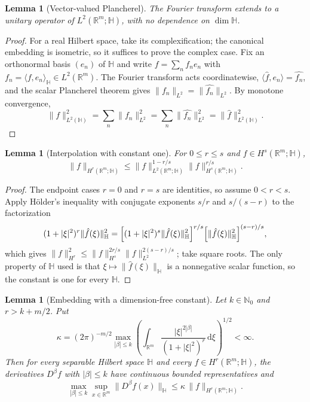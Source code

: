 \documentclass[11pt]{article}
\newtheorem{lemma}[theorem]{Lemma}
\theoremstyle{definition}
\theoremstyle{remark}
\newcommand{\R}{\mathbb{R}}
\newcommand{\dd}{\mathrm{d}}
\begin{document}
\begin{lemma}[Vector-valued Plancherel]\label{lem:vector-plancherel}
The Fourier transform extends to a unitary operator of $L^2(\R^m;\mathbb H)$, with no
dependence on $\dim\mathbb H$.
\end{lemma}

\begin{proof}
For a real Hilbert space, take its complexification; the canonical embedding is
isometric, so it suffices to prove the complex case.
Fix an orthonormal basis $(e_n)$ of $\mathbb H$ and write $f=\sum_nf_ne_n$ with
$f_n=\langle f,e_n\rangle_{\mathbb H}\in L^2(\R^m)$. The Fourier transform acts
coordinatewise, $\langle\hat f,e_n\rangle=\widehat{f_n}$, and the scalar
Plancherel theorem gives $\|f_n\|_{L^2}=\|\widehat{f_n}\|_{L^2}$. By monotone
convergence,
\[
\|f\|_{L^2(\mathbb H)}^2=\sum_n\|f_n\|_{L^2}^2
=\sum_n\|\widehat{f_n}\|_{L^2}^2=\|\hat f\|_{L^2(\mathbb H)}^2.
\]
\end{proof}

\begin{lemma}[Interpolation with constant one]\label{lem:hilbert-interpolation}
For $0\le r\le s$ and $f\in H^s(\R^m;\mathbb H)$,
\begin{equation}
    \|f\|_{H^r(\R^m;\mathbb H)}
    \le\|f\|_{L^2(\R^m;\mathbb H)}^{1-r/s}
       \|f\|_{H^s(\R^m;\mathbb H)}^{r/s}.
\end{equation}
\end{lemma}

\begin{proof}
The endpoint cases $r=0$ and $r=s$ are identities, so assume $0<r<s$.
Apply H\"older's inequality with conjugate exponents $s/r$ and $s/(s-r)$ to the
factorization
\begin{equation}
    (1+|\xi|^2)^r\|\hat f(\xi)\|_{\mathbb H}^2
    =\Bigl[(1+|\xi|^2)^s\|\hat f(\xi)\|_{\mathbb H}^2\Bigr]^{r/s}
     \Bigl[\|\hat f(\xi)\|_{\mathbb H}^2\Bigr]^{(s-r)/s},
\end{equation}
which gives
$\|f\|_{H^r}^2\le\|f\|_{H^s}^{2r/s}\|f\|_{L^2}^{2(s-r)/s}$; take square roots.
The only property of $\mathbb H$ used is that $\xi\mapsto\|\hat f(\xi)\|_{\mathbb H}$ is a
nonnegative scalar function, so the constant is one for every $\mathbb H$.
\end{proof}

\begin{lemma}[Embedding with a dimension-free constant]\label{lem:hilbert-embedding}
Let $k\in\mathbb N_0$ and $r>k+m/2$. Put
\begin{equation}
    \kappa=(2\pi)^{-m/2}\max_{|\beta|\le k}
      \left(\int_{\R^m}
        \frac{|\xi|^{2|\beta|}}{(1+|\xi|^2)^{r}}\,\dd\xi
      \right)^{1/2}<\infty .
    \label{eq:embedding-constant}
\end{equation}
Then for every separable Hilbert space $\mathbb H$ and every $f\in H^r(\R^m;\mathbb H)$, the
derivatives $D^\beta f$ with $|\beta|\le k$ have continuous bounded
representatives and
\begin{equation}
    \max_{|\beta|\le k}\sup_{x\in\R^m}\|D^\beta f(x)\|_{\mathbb H}
    \le\kappa\,\|f\|_{H^r(\R^m;\mathbb H)} .
\end{equation}
\end{lemma}
\end{document}
